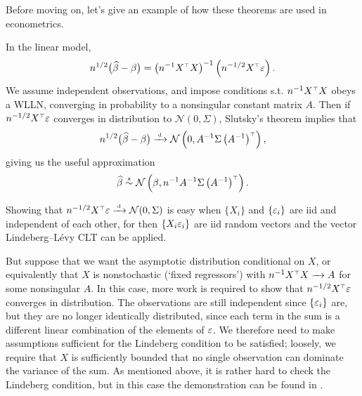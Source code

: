 \documentclass[11pt,letterpaper,reqno,oneside]{article}
\begin{document}
Before moving on, let's give an example of how these theorems are used in econometrics.
%
\begin{example}
	In the linear model,
	\begin{equation*}
		n^{1/2} \bigl( \widehat{\beta}-\beta \bigr)
		= \left( n^{-1} X^{\scriptscriptstyle \top} X \right)^{-1} 
		\left( n^{-1/2} X^{\scriptscriptstyle \top} \varepsilon \right) .
	\end{equation*}
	We assume independent observations, and impose conditions s.t. $n^{-1} X^{\scriptscriptstyle \top} X$ obeys a WLLN, converging in probability to a nonsingular constant matrix $A$. Then if $n^{-1/2} X^{\scriptscriptstyle \top} \varepsilon$ converges in distribution to $\mathcal{N}(0,\Sigma)$, Slutsky's theorem implies that
	\begin{equation*}
		n^{1/2} \bigl( \widehat{\beta}-\beta \bigr) 
		\xrightarrow{{\scriptscriptstyle \mathrm{\;d\;}}} \mathcal{N}\left( 0, 
		A^{-1} \Sigma \left(A^{-1}\right)^{\scriptscriptstyle \top} \right) ,
	\end{equation*}
	giving us the useful approximation
	\begin{equation*}
		\widehat{\beta} \protect\overset{{\scriptscriptstyle \mathrm{a}}}{\sim} 
		\mathcal{N}\left( \beta, 
		n^{-1} A^{-1} \Sigma \left(A^{-1}\right)^{\scriptscriptstyle \top} \right) .
	\end{equation*}
	

	Showing that $n^{-1/2} X^{\scriptscriptstyle \top} \varepsilon \xrightarrow{{\scriptscriptstyle \mathrm{\;d\;}}} \mathcal{N}(0,\Sigma)$ is easy when $\{ X_i \}$ and $\{ \varepsilon_i \}$ are iid and independent of each other, for then $\{ X_i \varepsilon_i \}$ are iid random vectors and the vector Lindeberg--Lévy CLT can be applied.

	But suppose that we want the asymptotic distribution conditional on $X$, or equivalently that $X$ is nonstochastic (`fixed regressors') with $n^{-1} X^{\scriptscriptstyle \top} X \xrightarrow{\;\;\;} A$ for some nonsingular $A$. In this case, more work is required to show that $n^{-1/2} X^{\scriptscriptstyle \top} \varepsilon$ converges in distribution. The observations are still independent since $\{ \varepsilon_i \}$ are, but they are no longer identically distributed, since each term in the sum is a different linear combination of the elements of $\varepsilon$. We therefore need to make assumptions sufficient for the Lindeberg condition to be satisfied; loosely, we require that $X$ is sufficiently bounded that no single observation can dominate the variance of the sum. As mentioned above, it is rather hard to check the Lindeberg condition, but in this case the demonstration can be found in \textcite{Amemiya1985}.
\end{example}



\end{document}
